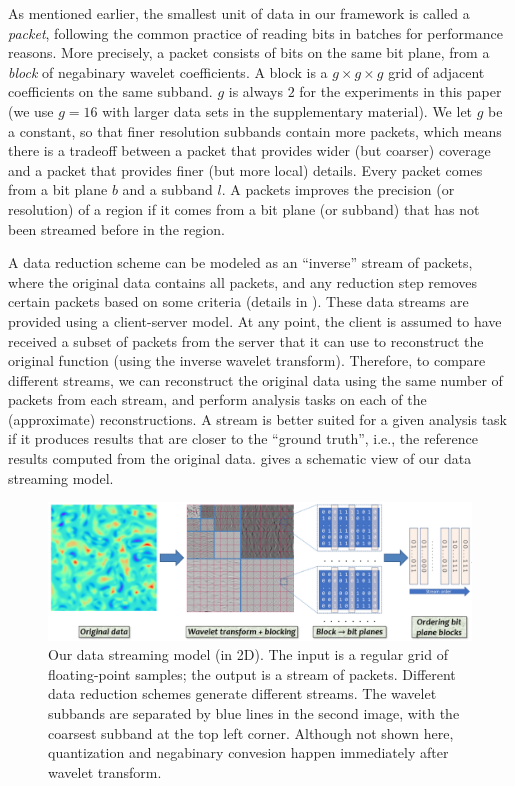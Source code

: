 As mentioned earlier, the smallest unit of data in our framework is called a \emph{packet},
following the common practice of reading bits in batches for performance reasons. More precisely, a
packet consists of bits on the same bit plane, from a \emph{block} of negabinary wavelet
coefficients. A block is a $g\times g\times g$ grid of adjacent coefficients on the same subband.
$g$ is always $2$ for the experiments in this paper (we use $g=16$ with larger data sets in the
supplementary material). We let $g$ be a constant, so that finer resolution subbands contain more
packets, which means there is a tradeoff between a packet that provides wider (but coarser) coverage
and a packet that provides finer (but more local) details. Every packet comes from a bit plane $b$
and a subband $l$. A packets improves the precision (or resolution) of a region if it comes from a
bit plane (or subband) that has not been streamed before in the region.

A data reduction scheme can be modeled as an ``inverse'' stream of packets, where the original data
contains all packets, and any reduction step removes certain packets based on some criteria (details
in ).  These data streams are provided using a client-server model.
At any point, the client is assumed to have received a subset of packets from the server that it
can use to reconstruct the original function (using the inverse wavelet transform). Therefore, to
compare different streams, we can reconstruct the original data using the same number of packets
from each stream, and perform analysis tasks on each of the (approximate) reconstructions. A stream
is better suited for a given analysis task if it produces results that are closer to the ``ground
truth'', i.e., the reference results computed from the original data.  gives a
schematic view of our data streaming model.

\begin{figure}[h]
\centering
\includegraphics[width=\linewidth]{img/pipeline.png}
\caption{Our data streaming model (in 2D). The input is a regular grid of floating-point samples;
the output is a stream of packets. Different data reduction schemes generate different streams.  The
wavelet subbands are separated by blue lines in the second image, with the coarsest subband at the
top left corner. Although not shown here, quantization and negabinary convesion happen immediately
after wavelet transform. }\label{fig:pipeline}
\end{figure}

